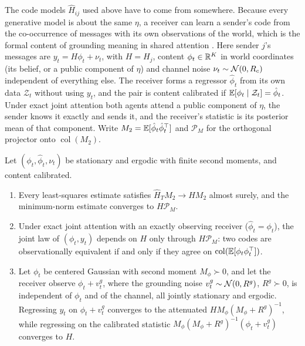 The code models $\hat H_{ij}$ used above have to come from somewhere. Because every generative model is about the same $\eta$, a receiver can learn a sender's code from the co-occurrence of messages with its own observations of the world, which is the formal content of grounding meaning in shared attention \citep{harnad1990symbol,tomasello2005understanding}. Here sender $j$'s messages are $y_t=H\phi_t+\nu_t$, with $H=H_j$, content $\phi_t\in\mathbb{R}^K$ in world coordinates (its belief, or a public component of $\eta$) and channel noise $\nu_t\sim\mathcal{N}(0,R_c)$ independent of everything else. The receiver forms a regressor $\hat\phi_t$ from its own data $\mathcal Z_t$ without using $y_t$, and the pair is content calibrated if $\mathbb{E}[\phi_t\mid\mathcal Z_t]=\hat\phi_t$. Under exact joint attention both agents attend a public component of $\eta$, the sender knows it exactly and sends it, and the receiver's statistic is its posterior mean of that component. Write $M_2=\mathbb{E}[\hat\phi_t\hat\phi_t^\top]$ and $\mathcal P_M$ for the orthogonal projector onto $\operatorname{col}(M_2)$.

\begin{proposition}\label{prop:fw-grounded-identification}
Let $(\phi_t,\hat\phi_t,\nu_t)$ be stationary and ergodic with finite second moments, and content calibrated.
\begin{enumerate}
\item[(a)] Every least-squares estimate satisfies $\hat H_TM_2\to HM_2$ almost surely, and the minimum-norm estimate converges to $H\mathcal P_M$.
\item[(b)] Under exact joint attention with an exactly observing receiver ($\hat\phi_t=\phi_t$), the joint law of $(\phi_t,y_t)$ depends on $H$ only through $H\mathcal P_M$: two codes are observationally equivalent if and only if they agree on $\operatorname{col}(\mathbb{E}[\phi_t\phi_t^\top])$.
\item[(c)] Let $\phi_t$ be centered Gaussian with second moment $M_\phi\succ0$, and let the receiver observe $\phi_t+v^g_t$, where the grounding noise $v^g_t\sim\mathcal{N}(0,R^g)$, $R^g\succ0$, is independent of $\phi_t$ and of the channel, all jointly stationary and ergodic. Regressing $y_t$ on $\phi_t+v^g_t$ converges to the attenuated $HM_\phi(M_\phi+R^g)^{-1}$, while regressing on the calibrated statistic $M_\phi(M_\phi+R^g)^{-1}(\phi_t+v^g_t)$ converges to $H$.
\end{enumerate}
\end{proposition}

